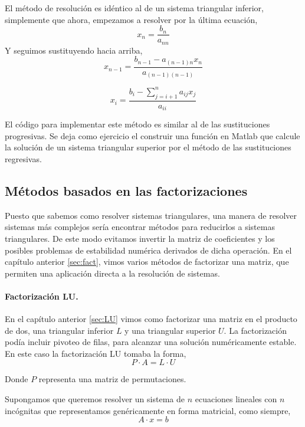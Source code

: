 El método de resolución es idéntico al de un sistema triangular inferior, simplemente que ahora, empezamos a resolver por la última ecuación,
\begin{equation*}
x_n=\frac{b_n}{a_{nn}}
\end{equation*}
Y seguimos sustituyendo hacia arriba,
\begin{equation*}
x_{n-1}=\frac{b_{n-1}-a_{(n-1)n}x_{n}}{a_{(n-1)(n-1)}}
\end{equation*}

\begin{equation*}
x_i=\frac{b_i-\sum_{j=i+1}^{n}a_{ij}x_j}{a_{ii}}
\end{equation*}

El código para implementar este método es similar al de las sustituciones progresivas. Se deja como ejercicio el construir una función en Matlab que calcule la solución de un sistema triangular superior por el método de las sustituciones regresivas.


\subsection{Métodos basados en las factorizaciones}
Puesto que sabemos como resolver sistemas triangulares, una manera de resolver sistemas más complejos sería encontrar métodos para reducirlos a sistemas triangulares. De este modo evitamos invertir la matriz de coeficientes y los posibles problemas de estabilidad numérica derivados de dicha operación. En el capítulo anterior \ref{sec:fact}, vimos varios métodos de factorizar una matriz, que permiten una aplicación directa a la resolución de sistemas.
\paragraph{Factorización LU.} En el capítulo anterior \ref{sec:LU} vimos como factorizar una matriz en el producto de dos, una triangular inferior $L$ y una triangular superior $U$. La factorización podía incluir pivoteo de filas, para alcanzar una solución numéricamente estable. En este caso la factorización LU tomaba la forma,
\begin{equation*}
P\cdot A = L\cdot U
\end{equation*}

Donde $P$ representa una matriz de permutaciones.

Supongamos que queremos resolver un sistema de $n$ ecuaciones lineales con $n$ incógnitas que representamos genéricamente en forma matricial, como siempre,
\begin{equation*}
A\cdot x=b
\end{equation*}

